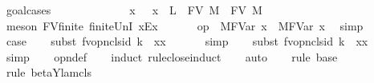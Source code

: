 \begin{isabellebody}
%
\isadelimproof
%
\endisadelimproof
%
\isatagproof
{}\isamarkupfalse%
\ goal{\isacharunderscore}cases\isanewline
{}\isamarkupfalse%
\ {}\isanewline
\ \ \isamarkupfalse%
\ {}{}\ {\isacharequal}\ {}\isanewline
\ \ \isamarkupfalse%
\ \isamarkupfalse%
\ x\ \ {}{\isacharcolon}\ {\isachardoublequoteopen}x\ {\isasymnotin}\ L\ {\isasymunion}\ FV\ M\ {\isasymunion}\ FV\ M{\isacharprime}{\isachardoublequoteclose}\ \isamarkupfalse%
\ {\isacharparenleft}meson\ FV{\isacharunderscore}finite\ finite{\isacharunderscore}UnI\ x{\isacharunderscore}Ex{\isacharparenright}\isanewline
\ \ \isamarkupfalse%
\ {}\ \isamarkupfalse%
\ {\isachardoublequoteopen}op\ {\isasymRightarrow}{\isacharasterisk}\ M{\isacharcircum}FVar\ x\ \ M{\isacharprime}{\isacharcircum}FVar\ x{\isachardoublequoteclose}\ \isamarkupfalse%
\ simp\isanewline
\ \ \isamarkupfalse%
\ \isamarkupfalse%
\ {\isacharquery}case\isanewline
\ \ \isamarkupfalse%
\ {\isacharparenleft}subst\ {\isacharparenleft}{}{\isacharparenright}fv{\isacharunderscore}opn{\isacharunderscore}cls{\isacharunderscore}id{}{\isacharbrackleft}\ k{\isacharequal}{}\ \ x{\isacharequal}x{\isacharbrackright}{\isacharparenright}\isanewline
\ \ \isamarkupfalse%
\ {}\ \isamarkupfalse%
\ simp\isanewline
\ \ \isamarkupfalse%
\ {\isacharparenleft}subst\ {\isacharparenleft}{}{\isacharparenright}fv{\isacharunderscore}opn{\isacharunderscore}cls{\isacharunderscore}id{}{\isacharbrackleft}\ k{\isacharequal}{}\ \ x{\isacharequal}x{\isacharbrackright}{\isacharparenright}\isanewline
\ \ \isamarkupfalse%
\ {}\ \isamarkupfalse%
\ simp\isanewline
\ \ \isamarkupfalse%
\ opn{\isacharprime}{\isacharunderscore}def\isanewline
\ \ \isamarkupfalse%
\ {\isacharparenleft}induct\ rule{\isacharcolon}close{\isachardot}induct{\isacharparenright}\isanewline
\ \ \isamarkupfalse%
\ auto\isanewline
\ \ \isamarkupfalse%
\ {\isacharparenleft}rule\ base{\isacharparenright}\isanewline
\ \ \isamarkupfalse%
\ {\isacharparenleft}rule\ beta{\isacharunderscore}Y{\isacharunderscore}lam{\isacharunderscore}cls{\isacharparenright}\isanewline

\end{isabellebody}
